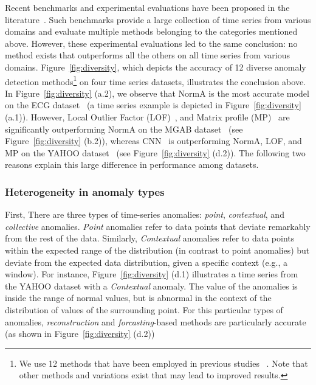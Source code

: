 Recent benchmarks and experimental evaluations have been proposed in the literature~\cite{10.14778/3538598.3538602,10.14778/3551793.3551830,kdd21}. Such benchmarks provide a large collection of time series from various domains and evaluate multiple methods belonging to the categories mentioned above. However, these experimental evaluations led to the same conclusion: no method exists that outperforms all the others on all time series from various domains. Figure~\ref{fig:diversity}, which depicts the accuracy of 12 diverse anomaly detection methods\footnote{We use 12 methods that have been employed in previous studies ~\cite{10.14778/3529337.3529354,10.14778/3551793.3551830}. Note that other methods and variations exist that may lead to improved results.} on four time series datasets, illustrates the conclusion above. In Figure~\ref{fig:diversity} (a.2), we observe that NormA is the most accurate model on the ECG dataset~\cite{Moody} (a time series example is depicted in Figure~\ref{fig:diversity} (a.1)). However, Local Outlier Factor (LOF)~\cite{Breunig:2000:LID:342009.335388}, and Matrix profile (MP)~\cite{DBLP:conf/icdm/YehZUBDDSMK16} are significantly outperforming NormA on the MGAB dataset~\cite{markus_thill_2020_3762385} (see Figure~\ref{fig:diversity} (b.2)), whereas CNN~\cite{8581424} is outperforming NormA, LOF, and MP on the YAHOO dataset~\cite{yahoo} (see Figure~\ref{fig:diversity} (d.2)). The following two reasons explain this large difference in performance among datasets.

\subsubsection{\textbf{Heterogeneity in anomaly types}}

First, There are three types of time-series anomalies: \textit{point}, \textit{contextual}, and \textit{collective} anomalies. \textit{Point} anomalies refer to data points that deviate remarkably from the rest of the data. Similarly, \textit{Contextual} anomalies refer to data points within the expected range of the distribution (in contrast to point anomalies) but deviate from the expected data distribution, given a specific context (e.g., a window). For instance, Figure~\ref{fig:diversity} (d.1) illustrates a time series from the YAHOO dataset with a \textit{Contextual} anomaly. The value of the anomalies is inside the range of normal values, but is abnormal in the context of the distribution of values of the surrounding point. For this particular types of anomalies, \textit{reconstruction} and \textit{forcasting}-based methods are particularly accurate (as shown in Figure~\ref{fig:diversity} (d.2))


